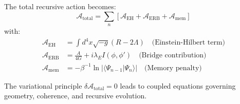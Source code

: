 The total recursive action becomes:
\begin{equation}
\mathcal{A}_{\text{total}} = \sum_n \left[ \mathcal{A}_{\text{EH}} + \mathcal{A}_{\text{ERB}} + \mathcal{A}_{\text{mem}} \right]
\end{equation}
with:
\begin{align*}
\mathcal{A}_{\text{EH}} &= \int d^4x \sqrt{-g}(R - 2\Lambda) \quad \text{(Einstein-Hilbert term)} \\
\mathcal{A}_{\text{ERB}} &= \frac{A}{4G} + i\lambda_E I(\phi,\phi') \quad \text{(Bridge contribution)} \\
\mathcal{A}_{\text{mem}} &= -\beta^{-1} \ln |\langle \Psi_{n-1}|\Psi_n\rangle| \quad \text{(Memory penalty)}
\end{align*}

The variational principle $\delta\mathcal{A}_{\text{total}} = 0$ leads to coupled equations governing geometry, coherence, and recursive evolution.
